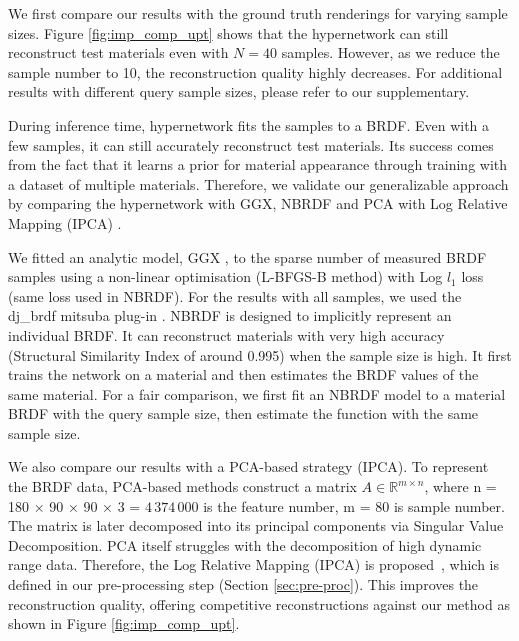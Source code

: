 We first compare our results with the ground truth renderings for varying sample sizes. Figure \ref{fig:imp_comp_upt} shows that the hypernetwork can still reconstruct test materials even with $N = 40$ samples. However, as we reduce the sample number to 10, the reconstruction quality highly decreases. For additional results with different query sample sizes, please refer to our supplementary.

During inference time, hypernetwork fits the samples to a BRDF. Even with a few samples, it can still accurately reconstruct test materials. Its success comes from the fact that it learns a prior for material appearance through training with a dataset of multiple materials. Therefore, we validate our generalizable approach by comparing the hypernetwork with GGX, NBRDF \cite{sztrajman2021neural} and PCA with Log Relative Mapping (IPCA) \cite{nielsen2015optimal}.

We fitted an analytic model, GGX \cite{walter2007microfacet}, to the sparse number of measured BRDF samples using a non-linear optimisation (L-BFGS-B method) with Log $l_1$ loss (same loss used in NBRDF). For the results with all samples, we used the dj\_brdf mitsuba plug-in \cite{dupuy2015photorealistic}. NBRDF \cite{sztrajman2021neural} is designed to implicitly represent an individual BRDF. It can reconstruct materials with very high accuracy (Structural Similarity Index of around 0.995) when the sample size is high. It first trains the network on a material and then estimates the BRDF values of the same material. For a fair comparison, we first fit an NBRDF model to a material BRDF with the query sample size, then estimate the function with the same sample size. 

We also compare our results with a PCA-based strategy (IPCA). To represent the BRDF data, PCA-based methods  \cite{matusik2003data, ngan2006image} construct a matrix ${A} \in \mathbb{R}^{m \times n}$, where n = 180 × 90 × 90 × 3 = $4\,374\,000$ is the feature number, m = 80 is sample number. The matrix is later decomposed into its principal components via Singular Value Decomposition. PCA itself struggles with the decomposition of high dynamic range data. Therefore, the Log Relative Mapping (IPCA) is proposed~\cite{nielsen2015optimal}, which is defined in our pre-processing step (Section \ref{sec:pre-proc}). This improves the reconstruction quality, offering competitive reconstructions against our method as shown in Figure \ref{fig:imp_comp_upt}.


